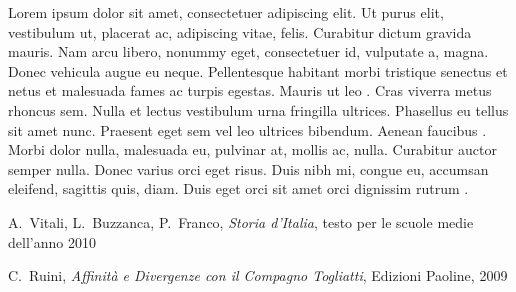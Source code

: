 \documentclass[a4paper,12pt]{article}
\begin{document}
Lorem ipsum dolor sit amet, consectetuer adipiscing elit. Ut purus elit, vestibulum ut, placerat ac,  adipiscing vitae, felis. Curabitur dictum gravida mauris. Nam arcu libero, nonummy eget, consectetuer id, vulputate a, magna. Donec vehicula augue eu neque. Pellentesque habitant morbi tristique senectus et netus et malesuada fames ac turpis egestas. Mauris ut leo \cite{VBF} . Cras viverra metus rhoncus sem. Nulla et lectus vestibulum urna fringilla ultrices.  Phasellus eu tellus sit amet  nunc. Praesent eget sem vel leo ultrices bibendum. Aenean faucibus \cite{R}. Morbi dolor nulla, malesuada eu, pulvinar at, mollis ac, nulla. Curabitur auctor semper nulla. Donec varius orci eget risus. Duis nibh mi, congue eu, accumsan eleifend, sagittis quis, diam. Duis eget orci sit amet orci dignissim rutrum .



\begin{thebibliography}{666}
	A.~Vitali, L.~Buzzanca, P.~Franco, \textit{Storia d'Italia}, testo per le scuole medie dell'anno 2010

	C.~Ruini, \textit{Affinità e Divergenze con il Compagno Togliatti}, Edizioni Paoline, 2009
\end{thebibliography}
\end{document}
